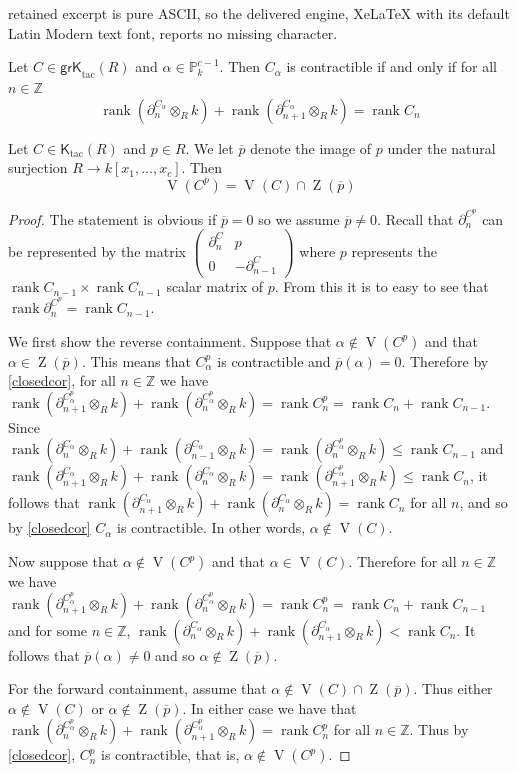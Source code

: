 \documentclass[10pt,a4paper]{amsart}
\newcommand{\Ktac}{\operatorname{\mathsf{K}_{tac}}\nolimits}
\newcommand{\V}{\operatorname{V}}
\newcommand{\Z}{\operatorname{Z}}
\newcommand{\grKtac}{\operatorname{\mathsf{grK}_{tac}}\nolimits}
\newcommand{\rank}{\operatorname{rank}}
\begin{document}
retained excerpt is pure ASCII, so the delivered engine, XeLaTeX with its default Latin Modern text font, reports no missing character.
\begin{corollary}\label{closedcor} Let $C\in\grKtac(R)$ and $\alpha\in\mathbb P^{c-1}_k$.  Then $C_\alpha$ is 
contractible if and only if for all $n\in\mathbb Z$
\[
\rank(\partial^{C_\alpha}_n\otimes_R k)+\rank(\partial^{C_\alpha}_{n+1}\otimes_Rk)=\rank C_n
\]
\end{corollary}

\begin{lemma}\label{lemma} Let $C\in\Ktac(R)$ and $p\in R$.  We let $\overline p$ denote the image of $p$ under the natural surjection $R\to k[x_1,\dots,x_c]$. Then
\[
\V(C^p)=\V(C)\cap\Z(\overline p)
\]
\end{lemma} 

\begin{proof} The statement is obvious if $\overline p=0$ so we assume $\overline p\ne 0$. Recall that $\partial_n^{C^p}$ can be represented by the matrix
$\left(\begin{array}{cc} \partial_n^C & p\\ 0 & -\partial_{n-1}^C \end{array}\right)$
where $p$ represents the $\rank C_{n-1}\times\rank C_{n-1}$ scalar matrix of $p$. From this it
is to easy to see that $\rank\partial^{C^p}_n=\rank C_{n-1}$.

We first show the reverse containment. Suppose that $\alpha\notin \V(C^p)$ and that 
$\alpha\in\Z(\overline p)$. This means that $C^p_\alpha$ is contractible and 
$\overline p(\alpha)=0$. Therefore by \ref{closedcor}, for all $n\in\mathbb Z$ we have 
$\rank(\partial^{C^p_\alpha}_{n+1}\otimes_Rk)+\rank(\partial^{C^p_\alpha}_n\otimes_Rk)=
\rank C^p_n=\rank C_n+\rank C_{n-1}$. Since $\rank(\partial^{C_\alpha}_n\otimes_Rk)+
\rank(\partial^{C_\alpha}_{n-1}\otimes_Rk)=\rank(\partial^{C^p_\alpha}_n\otimes_Rk)\le\rank C_{n-1}$ and $\rank(\partial^{C_\alpha}_{n+1}\otimes_Rk)+
\rank(\partial^{C_\alpha}_n\otimes_Rk)=\rank(\partial^{C^p_\alpha}_{n+1}\otimes_Rk)\le\rank C_n$, it follows that  
$\rank(\partial^{C_\alpha}_{n+1}\otimes_Rk)+
\rank(\partial^{C_\alpha}_n\otimes_Rk)=\rank C_n$ for all $n$, and so by \ref{closedcor} $C_\alpha$ is contractible. In other words, $\alpha\notin\V(C)$.

Now suppose that $\alpha\notin \V(C^p)$ and that $\alpha\in\V(C)$. Therefore for all $n\in\mathbb Z$ we have $\rank(\partial^{C^p_\alpha}_{n+1}\otimes_Rk)+\rank(\partial^{C^p_\alpha}_n\otimes_Rk)=
\rank C^p_n=\rank C_n+\rank C_{n-1}$ and for some $n\in\mathbb Z$, 
$\rank(\partial^{C_\alpha}_n\otimes_R k)+\rank(\partial^{C_\alpha}_{n+1}\otimes_Rk)<\rank C_n$.
It follows that $\overline p(\alpha)\ne 0$ and so $\alpha\notin\Z(\overline p)$.

For the forward containment, assume that $\alpha\notin\V(C)\cap\Z(\overline p)$.  Thus either
$\alpha\notin\V(C)$ or $\alpha\notin\Z(\overline p)$. In either case we have that 
$\rank(\partial^{C^p_\alpha}_n\otimes_Rk)+\rank(\partial^{C^p_\alpha}_{n+1}\otimes_Rk)=\rank C^p_n$ for all $n\in\mathbb Z$. Thus by \ref{closedcor}, $C^p_n$ is contractible, that is, 
$\alpha\notin\V(C^p)$.
\end{proof}
\end{document}
